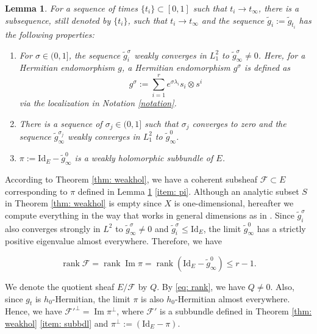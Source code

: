 \documentclass[a4, 12pt, 
]{amsart}
\numberwithin{equation}{section}
\theoremstyle{plain}
\newtheorem{lem}[equation]{Lemma}
\theoremstyle{definition}
\theoremstyle{remark}
\begin{document}
\begin{lem}\label{lem: L^2_1(LT)}
    For a sequence of times $\{t_i\}\subset[0,1]$ such that $t_i\to t_\infty$, 
    there is a subsequence, still denoted by $\{t_i\}$, such that $t_i\to t_\infty$ and the sequence $\tilde{g}_i:=\tilde{g}_{t_i}$ has the following properties:
    \begin{enumerate}[font=\normalfont]
        \item\label{item: L^2_1} For $\sigma\in(0,1]$, the sequence $\tilde{g}^\sigma_i$ weakly converges in $L^2_1$ to $\tilde{g}^\sigma_\infty\neq 0$. Here, for a Hermitian endomorphism $g$, a Hermitian endomorphism $g^\sigma$ is defined as
        $$g^\sigma:=\sum_{i=1}^r e^{\sigma\lambda_i}s_i\otimes s^i$$
        via the localization in Notation \ref{notation}.
        \item\label{item: sigmaj} There is a sequence of $\sigma_j\in(0,1]$ such that $\sigma_j$ converges to zero and the sequence $\tilde{g}_\infty^{\sigma_j}$ weakly converges in $L^2_1$ to $\tilde{g}^0_\infty$.
        \item\label{item: pi} $\pi:=\mathrm{Id}_E-\tilde{g}^0_\infty$ is a weakly holomorphic subbundle of $E$.
    \end{enumerate}
\end{lem}
            
According to Theorem \ref{thm: weakhol}, we have a coherent subsheaf $\mathcal{F}\subset E$ corresponding to $\pi$ defined in Lemma \ref{lem: L^2_1(LT)} \eqref{item: pi}. 
Although an analytic subset $S$ in Theorem \ref{thm: weakhol} is empty since $X$ is one-dimensional, hereafter we compute everything in the way that works in general dimensions as in \cite{UY}.
Since $\tilde{g}^\sigma_i$ also converges strongly in $L^2$ to $\tilde{g}^\sigma_\infty\neq 0$ and $\tilde{g}^\sigma_i\le \mathrm{Id}_E$, the limit $\tilde{g}^0_\infty$ has a strictly positive eigenvalue almost everywhere. 
Therefore, we have

\begin{equation}\label{eq: rank}
    \operatorname{rank}\mathcal{F}=\operatorname{rank} \operatorname{Im}\pi=\operatorname{rank} (\mathrm{Id}_E-\tilde{g}_\infty^0)\le r-1.
\end{equation}

We denote the quotient sheaf $E/\mathcal{F}$ by $Q$. By \eqref{eq: rank}, we have $Q\neq 0$. Also, since $g_t$ is $h_0$-Hermitian, the limit $\pi$ is also $h_0$-Hermitian almost everywhere. Hence, we have $\mathcal{F'}^\perp=\operatorname{Im}\pi^\perp$, where $\mathcal{F'}$ is a subbundle defined in Theorem \ref{thm: weakhol} \eqref{item: subbdl} and $\pi^\perp:=(\mathrm{Id}_E-\pi)$.
\end{document}
